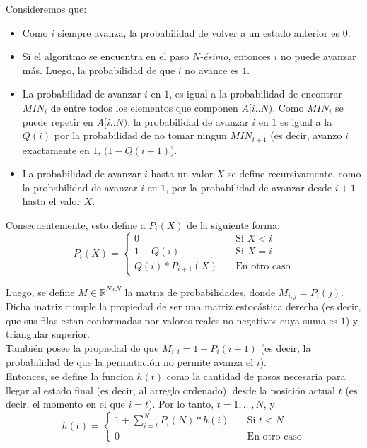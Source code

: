 \noindent Consideremos que:
\begin{itemize}
	\item Como $i$ siempre avanza, la probabilidad de volver a un estado anterior es $0$.
	\item Si el algoritmo se encuentra en el paso \emph{N-ésimo}, entonces $i$ no puede avanzar más. Luego, la probabilidad de que $i$ no avance es $1$.
	\item La probabilidad de avanzar $i$ en $1$, es igual a la probabilidad de encontrar $MIN_i$ de entre todos los elementos que componen $A[i..N)$. Como $MIN_i$ se puede repetir en $A[i..N)$, la probabilidad de avanzar $i$ en $1$ es igual a la $Q(i)$ por la probabilidad de no tomar ningun $MIN_{i+1}$ (es decir, avanzo $i$ exactamente en $1$, $(1-Q(i+1)$).
	\item La probabilidad de avanzar $i$ hasta un valor $X$ se define recursivamente, como la probabilidad de avanzar $i$ en $1$, por la probabilidad de avanzar desde $i+1$ hasta el valor $X$.
\end{itemize}

\noindent Consecuentemente, esto define a $P_i(X)$ de la siguiente forma:
\[
	P_i(X) =
		\begin{cases}
			0 & \quad \text{Si }X < i \\
			1 - Q(i) & \quad \text{Si }X = i \\
			Q(i) * P_{i+1}(X) & \quad \text{En otro caso}
		\end{cases}
\]


Luego, se define $M \in \mathbb{R}^{NxN}$ la matriz de probabilidades, donde $M_{i,j} = P_i(j)$.
Dicha matriz cumple la propiedad de ser una matriz estocástica derecha (es decir, que sus filas estan conformadas por valores reales no negativos cuya suma es $1$) y triangular superior.\\
También posee la propiedad de que $M_{i,i} = 1 - P_i(i+1)$ (es decir, la probabilidad de que la permutación no permite avanza el $i$).\\

Entonces, se define la funcion $h(t)$ como la cantidad de pasos necesaria para llegar al estado final (es decir, al arreglo ordenado), desde la posición actual $t$ (es decir, el momento en el que $i = t$). Por lo tanto, $t = 1,...,N$, y
\[
	h(t) =
	\begin{cases}
		\displaystyle 1 + \sum_{i = t}^{N} P_i(N)*h(i) & \quad \text{Si }t < N \\
		0 & \quad \text{En otro caso}
	\end{cases}
\]

